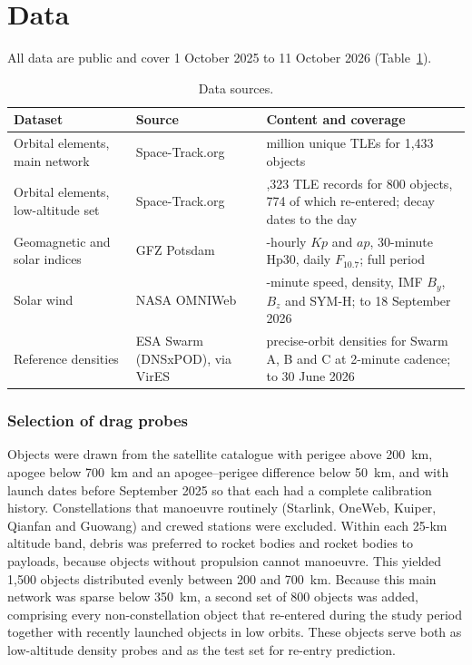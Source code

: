 \documentclass[11pt]{article}
\newcommand{\Kp}{\mathit{Kp}}
\newcommand{\ap}{\mathit{ap}}
\begin{document}
\section{Data}

All data are public and cover 1 October 2025 to 11 October 2026 (Table~\ref{tab:data}).

\begin{table}[!htbp]
\centering\small
\caption{Data sources.}\label{tab:data}
\begin{tabular}{@{}>{\raggedright}p{4.3cm}>{\raggedright}p{3.0cm}>{\raggedright\arraybackslash}p{6.9cm}@{}}
\toprule
Dataset & Source & Content and coverage \\
\midrule
Orbital elements, main network & Space-Track.org & 1.04 million unique TLEs for 1,433 objects \\
Orbital elements, low-altitude set & Space-Track.org & 280,323 TLE records for 800 objects, 774 of which re-entered; decay dates to the day \\
Geomagnetic and solar indices & GFZ Potsdam & 3-hourly $\Kp$ and $\ap$, 30-minute Hp30, daily $F_{10.7}$; full period \\
Solar wind & NASA OMNIWeb \citep{king2005} & 5-minute speed, density, IMF $B_y$, $B_z$ and SYM-H; to 18 September 2026 \\
Reference densities & ESA Swarm (DNSxPOD), via VirES & precise-orbit densities for Swarm A, B and C at 2-minute cadence; to 30 June 2026 \\
\bottomrule
\end{tabular}
\end{table}

\subsubsection{Selection of drag probes}
Objects were drawn from the satellite catalogue with perigee above 200~km, apogee below 700~km and an apogee--perigee difference below 50~km, and with launch dates before September 2025 so that each had a complete calibration history. Constellations that manoeuvre routinely (Starlink, OneWeb, Kuiper, Qianfan and Guowang) and crewed stations were excluded. Within each 25-km altitude band, debris was preferred to rocket bodies and rocket bodies to payloads, because objects without propulsion cannot manoeuvre. This yielded 1,500 objects distributed evenly between 200 and 700~km. Because this main network was sparse below 350~km, a second set of 800 objects was added, comprising every non-constellation object that re-entered during the study period together with recently launched objects in low orbits. These objects serve both as low-altitude density probes and as the test set for re-entry prediction.
\end{document}
